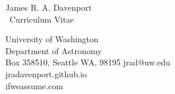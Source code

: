 \documentclass{article}
\begin{document}
\begin{center}


{\LARGE{\sc James R. A. Davenport}}\\
\smallskip
{\large{{ \hrulefill \, {\calligra Curriculum Vitae} \hspace{0.7mm} \,\hrulefill}}}\\
\end{center}
\normalsize
\normalfont


\thispagestyle{empty} %

\addresses
{
University of Washington\\
Department of Astronomy\\
Box 358510, Seattle WA, 98195
}
{jrad@uw.edu\\
jradavenport.github.io\\
ifweassume.com\\
\normalsize
}
\end{document}
